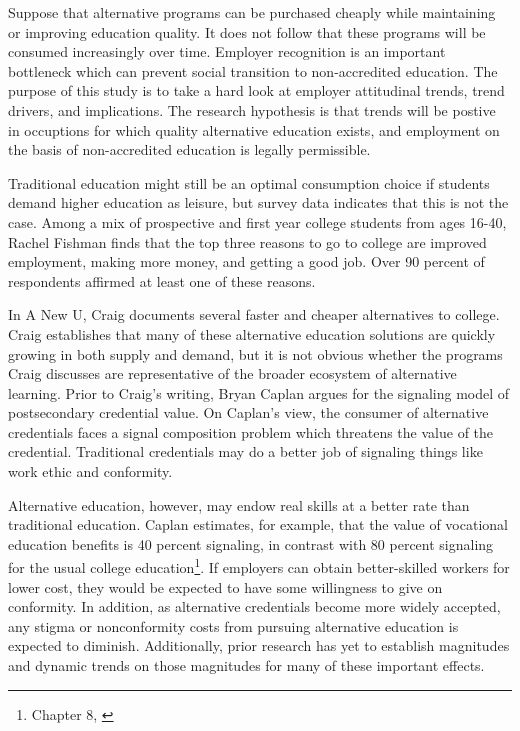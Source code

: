 \documentclass[AER]{./aea-latex-templates/AEA}
\begin{document}
        Suppose that alternative programs can be purchased cheaply while
        maintaining or improving education quality. It does not follow that
        these programs will be consumed increasingly over time. Employer recognition is
        an important bottleneck which can prevent social transition to non-accredited
        education. The purpose of this study is to take a hard look at employer
        attitudinal trends, trend drivers, and implications. The research hypothesis
        is that trends will be postive in occuptions for which quality alternative
        education exists, and employment on the basis of non-accredited education
        is legally permissible.
        
        Traditional education might still be an optimal consumption choice if
        students demand higher education as leisure, but survey data indicates
        that this is not the case. Among a mix of prospective and first year
        college students from ages 16-40\cite{fishman_2015}, Rachel Fishman finds that the top three
        reasons to go to college are improved employment, making more money, and
        getting a good job. Over 90 percent of respondents affirmed at least one of these
        reasons.
        
        In A New U, Craig documents several faster and cheaper alternatives to
        college\cite{craig_2018}. Craig establishes that many of these alternative education
        solutions are quickly growing in both supply and demand, but it is not
        obvious whether the programs Craig discusses are representative of the
        broader ecosystem of alternative learning. Prior to Craig’s writing, Bryan
        Caplan argues for the signaling model of postsecondary credential value\cite{caplan2018case}.
        On Caplan’s view, the consumer of alternative credentials faces a signal
        composition problem which threatens the value of the credential.
        Traditional credentials may do a better job of signaling things like work
        ethic and conformity.
        
        Alternative education, however, may endow real skills at a better rate
        than traditional education. Caplan estimates, for example, that the value
        of vocational education benefits is 40 percent signaling, in contrast with 80 percent
        signaling for the usual college education\footnote{Chapter 8, \cite{caplan2018case}}. If employers can obtain
        better-skilled workers for lower cost, they would be expected to have some
        willingness to give on conformity. In addition, as alternative credentials
        become more widely accepted, any stigma or nonconformity costs from
        pursuing alternative education is expected to diminish. Additionally,
        prior research has yet to establish magnitudes and dynamic trends on those
        magnitudes for many of these important effects.
        
\end{document}
